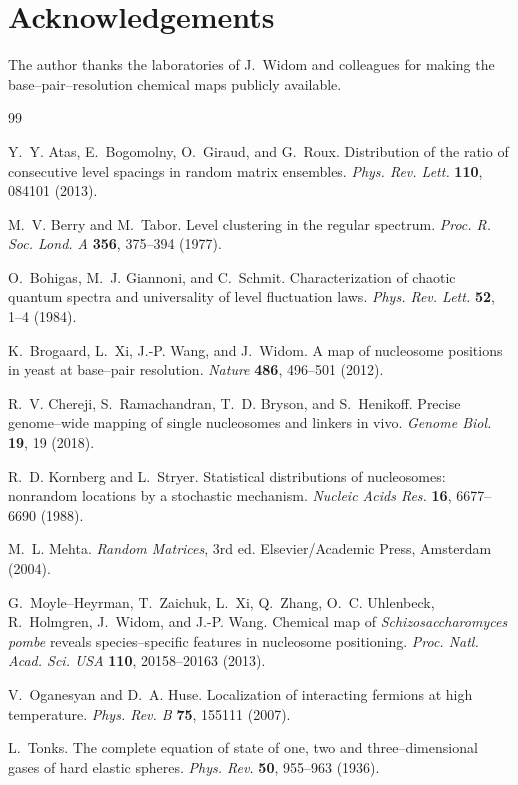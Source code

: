 \documentclass[11pt]{article}
\begin{document}
\section*{Acknowledgements}
The author thanks the laboratories of J.\ Widom and colleagues for making the
base--pair--resolution chemical maps publicly available.

\begin{thebibliography}{99}

Y.~Y. Atas, E.~Bogomolny, O.~Giraud, and G.~Roux.
Distribution of the ratio of consecutive level spacings in random matrix
ensembles. \textit{Phys. Rev. Lett.} \textbf{110}, 084101 (2013).

M.~V. Berry and M.~Tabor.
Level clustering in the regular spectrum.
\textit{Proc. R. Soc. Lond. A} \textbf{356}, 375--394 (1977).

O.~Bohigas, M.~J. Giannoni, and C.~Schmit.
Characterization of chaotic quantum spectra and universality of level
fluctuation laws. \textit{Phys. Rev. Lett.} \textbf{52}, 1--4 (1984).

K.~Brogaard, L.~Xi, J.-P. Wang, and J.~Widom.
A map of nucleosome positions in yeast at base--pair resolution.
\textit{Nature} \textbf{486}, 496--501 (2012).

R.~V. Chereji, S.~Ramachandran, T.~D. Bryson, and S.~Henikoff.
Precise genome--wide mapping of single nucleosomes and linkers in vivo.
\textit{Genome Biol.} \textbf{19}, 19 (2018).

R.~D. Kornberg and L.~Stryer.
Statistical distributions of nucleosomes: nonrandom locations by a stochastic
mechanism. \textit{Nucleic Acids Res.} \textbf{16}, 6677--6690 (1988).

M.~L. Mehta. \textit{Random Matrices}, 3rd ed.
Elsevier/Academic Press, Amsterdam (2004).

G.~Moyle--Heyrman, T.~Zaichuk, L.~Xi, Q.~Zhang, O.~C. Uhlenbeck, R.~Holmgren,
J.~Widom, and J.-P. Wang.
Chemical map of \textit{Schizosaccharomyces pombe} reveals species--specific
features in nucleosome positioning.
\textit{Proc. Natl. Acad. Sci. USA} \textbf{110}, 20158--20163 (2013).

V.~Oganesyan and D.~A. Huse.
Localization of interacting fermions at high temperature.
\textit{Phys. Rev. B} \textbf{75}, 155111 (2007).

L.~Tonks.
The complete equation of state of one, two and three--dimensional gases of hard
elastic spheres. \textit{Phys. Rev.} \textbf{50}, 955--963 (1936).

\end{thebibliography}
\end{document}

